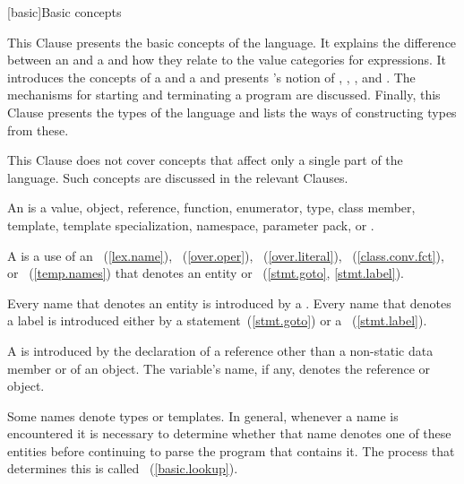 [basic]{Basic concepts}


\pnum
\enternote This Clause presents the basic concepts of the \Cpp language.
It explains the difference between an  and a
 and how they relate to the value categories for expressions.
It introduces the concepts of a
 and a  and presents \Cpp's
notion of , , , and
 . The mechanisms for starting and
terminating a program are discussed. Finally, this Clause presents the
 types of the language and lists the ways of constructing
 types from these.\exitnote

\pnum
\enternote This Clause does not cover concepts that affect only a single
part of the language. Such concepts are discussed in the relevant
Clauses. \exitnote

\pnum
{}%
%
%
%
%
%
%
%
%
An  is a value, object, reference, function, enumerator, type,
class member, template, template specialization, namespace, parameter
pack, or .

\pnum
A  is a use of an ~(\ref{lex.name}),
~(\ref{over.oper}),
~(\ref{over.literal}),
~(\ref{class.conv.fct}), or
~(\ref{temp.names}) that denotes an entity or
~(\ref{stmt.goto}, \ref{stmt.label}).

\pnum
Every name that denotes an entity is introduced by a
. Every name that denotes a label is introduced
either by a  statement~(\ref{stmt.goto}) or a
~(\ref{stmt.label}).

\pnum
A  is introduced by the
declaration of
a reference other than a non-static data member or of
an object. The variable's name, if any, denotes the reference or object.

\pnum
Some names denote types or templates. In general,
whenever a name is encountered it is necessary to determine whether that name denotes
one of these entities before continuing to parse the program that contains it. The
process that determines this is called
%
~(\ref{basic.lookup}).

